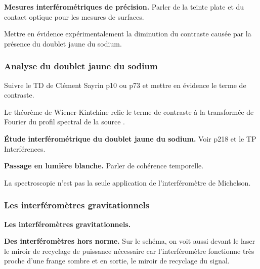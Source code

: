 \begin{slide}
\textbf{Mesures interférométriques de précision.}
Parler de la teinte plate et du contact optique pour les mesures de surfaces.
\end{slide}

\begin{transition}
Mettre en évidence expérimentalement la diminution du contraste causée par la présence du doublet jaune du sodium.
\end{transition}

\subsubsection{Analyse du doublet jaune du sodium}

Suivre le TD de Clément Sayrin p10 ou \cite{Olivier2000} p73 et mettre en évidence le terme de contraste.

\begin{remarque}
Le théorème de Wiener-Kintchine relie le terme de contraste à la transformée de Fourier du profil spectral de la source \cite{Perez2017}.
\end{remarque}

\begin{experience}
\textbf{Étude interférométrique du doublet jaune du sodium.}
Voir \cite{Fruchart2016} p218 et le TP Interférences.
\end{experience}

\begin{experience}
\textbf{Passage en lumière blanche.}
Parler de cohérence temporelle.
\end{experience}

\begin{transition}
La spectroscopie n'est pas la seule application de l'interféromètre de Michelson.
\end{transition}

\subsubsection{Les interféromètres gravitationnels}

\begin{slide}
\textbf{Les interféromètres gravitationnels.}
\end{slide}

\begin{slide}
\textbf{Des interféromètres hors norme.}
Sur le schéma, on voit aussi devant le laser le miroir de recyclage de puissance nécessaire car l'interféromètre fonctionne très proche d'une frange sombre et en sortie, le miroir de recyclage du signal.
\end{slide}


